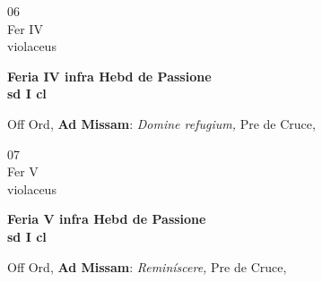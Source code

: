 \documentclass[10pt, openany]{book}
\begin{document}
        \begin{center}
            \begin{minipage}{3.5in}
                \vspace{2em}
                \begin{minipage}{0.5in}
                    {\Huge 06} \\
                    {\normalsize Fer IV} \\
                    {\normalsize violaceus}
                \end{minipage}
                \begin{minipage}{3.0in}
                    \textbf{ \large Feria IV infra Hebd de Passione \\
                    \textnormal{\normalsize sd I cl}} \\ 
                \end{minipage}
                \begin{justify}Off Ord, \textbf{Ad Missam}: \textit{Domine refugium,} Pre de Cruce,   
                \end{justify}
            \end{minipage}
        \end{center}
    
        \begin{center}
            \begin{minipage}{3.5in}
                \vspace{2em}
                \begin{minipage}{0.5in}
                    {\Huge 07} \\
                    {\normalsize Fer V} \\
                    {\normalsize violaceus}
                \end{minipage}
                \begin{minipage}{3.0in}
                    \textbf{ \large Feria V infra Hebd de Passione \\
                    \textnormal{\normalsize sd I cl}} \\ 
                \end{minipage}
                \begin{justify}Off Ord, \textbf{Ad Missam}: \textit{Reminíscere,} Pre de Cruce,   
                \end{justify}
            \end{minipage}
        \end{center}
    
\end{document}
